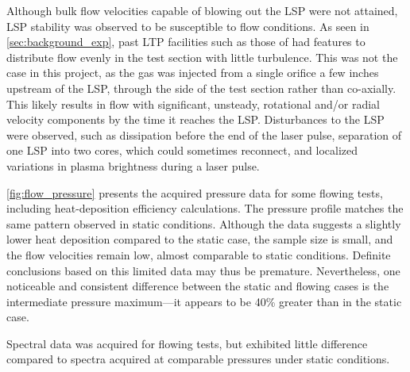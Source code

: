         Although bulk flow velocities capable of blowing out the LSP were not attained, LSP stability was observed to be susceptible to flow conditions. As seen in \autoref{sec:background_exp}, past LTP facilities such as those of \textcite{toyodaThrustPerformanceCW2002} had features to distribute flow evenly in the test section with little turbulence. This was not the case in this project, as the gas was injected from a single orifice a few inches upstream of the LSP, through the side of the test section rather than co-axially. This likely results in flow with significant, unsteady, rotational and/or radial velocity components by the time it reaches the LSP. Disturbances to the LSP were observed, such as dissipation before the end of the laser pulse, separation of one LSP into two cores, which could sometimes reconnect, and localized variations in plasma brightness during a laser pulse.

        \autoref{fig:flow_pressure} presents the acquired pressure data for some flowing tests, including heat-deposition efficiency calculations. The pressure profile matches the same pattern observed in static conditions. Although the data suggests a slightly lower heat deposition compared to the static case, the sample size is small, and the flow velocities remain low, almost comparable to static conditions. Definite conclusions based on this limited data may thus be premature.  Nevertheless, one noticeable and consistent difference between the static and flowing cases is the intermediate pressure maximum---it appears to be 40\% greater than in the static case. 

        Spectral data was acquired for flowing tests, but exhibited little difference compared to spectra acquired at comparable pressures under static conditions.

